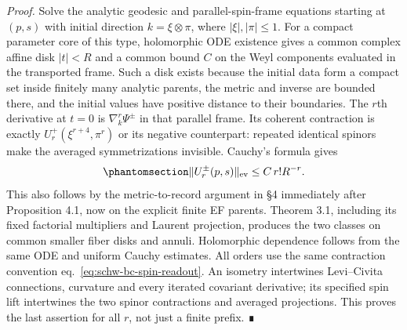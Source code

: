\documentclass[
  english,
  11pt,
  reqno]{amsart}
\begin{document}
\emph{Proof.} Solve the analytic geodesic and parallel-spin-frame
equations starting at \((p,s)\) with initial direction
\(k=\xi\otimes\pi\), where \(|\xi|,|\pi|\le1\). For a compact parameter
core of this type, holomorphic ODE existence gives a common complex
affine disk \(|t|<R\) and a common bound \(C\) on the Weyl components
evaluated in the transported frame. Such a disk exists because the
initial data form a compact set inside finitely many analytic parents,
the metric and inverse are bounded there, and the initial values have
positive distance to their boundaries. The \(r\)th derivative at \(t=0\)
is \(\nabla_k^r\Psi^\pm\) in that parallel frame. Its coherent
contraction is exactly \(U_r^+(\xi^{r+4},\pi^r)\) or its negative
counterpart: repeated identical spinors make the averaged
symmetrizations invisible. Cauchy's formula gives
\begin{equation}\protect\phantomsection\label{eq:schw-bc-record-bound}{
 \|U_r^\pm(p,s)\|_{\mathrm{ev}}\le C\,r!R^{-r}.
}\end{equation} This also follows by the metric-to-record argument in §4
immediately after Proposition 4.1, now on the explicit finite EF
parents. Theorem 3.1, including its fixed factorial multipliers and
Laurent projection, produces the two classes on common smaller fiber
disks and annuli. Holomorphic dependence follows from the same ODE and
uniform Cauchy estimates. All orders use the same contraction convention
eq.~\ref{eq:schw-bc-spin-readout}. An isometry intertwines Levi--Civita
connections, curvature and every iterated covariant derivative; its
specified spin lift intertwines the two spinor contractions and averaged
projections. This proves the last assertion for all \(r\), not just a
finite prefix. ∎
\end{document}
